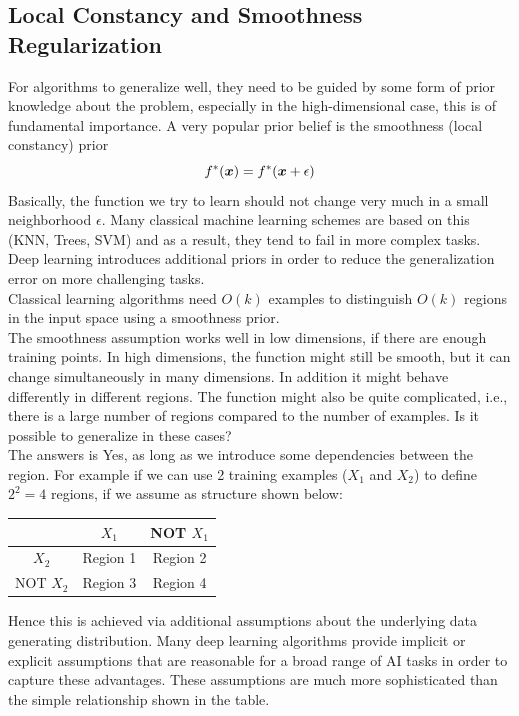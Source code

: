 \begin{multicols}{2}
	\subsection{Local Constancy and Smoothness Regularization}
	For algorithms to generalize well, they need to be guided by some form of prior knowledge about the problem, especially in the high-dimensional case, this is of fundamental importance.
	A very popular prior belief is the smoothness (local constancy) prior
	\[ f^\ast ({\bm{x}}) = f^\ast ({\bm{x}} + \epsilon) \]
	Basically, the function we try to learn should not change very much in a small neighborhood $\epsilon$.
	Many classical machine learning schemes are based on this (KNN, Trees, SVM) and as a result, they tend to fail in more complex tasks.
	Deep learning introduces additional priors in order to reduce the generalization error on more challenging tasks.\\
	Classical learning algorithms need $O(k)$ examples to distinguish $O(k)$ regions in the input space using a smoothness prior.\\

	The smoothness assumption works well in low dimensions, if there are enough training points.
	In high dimensions, the function might still be smooth, but it can change simultaneously in many dimensions.
	In addition it might behave differently in different regions.
	The function might also be quite complicated, i.e., there is a large number of regions compared to the number of examples. Is it possible to generalize in these cases?\\
	
	The answers is Yes, as long as we introduce some dependencies between the region.
	For example if we can use 2 training examples ($X_1$ and $X_2$) to define $2^2=4$ regions, if we assume as structure shown below:
	\begin{table}[H]
		\centering
		\begin{tabular}{c|c|c|}
			& $X_1$ & NOT $X_1$ \\ 
			\hline 
			$X_2$ & Region 1 & Region 2 \\ 
			\hline 
			NOT $X_2$ & Region 3 & Region 4 \\
			\hline
		\end{tabular} 
	\end{table}

	Hence this is achieved via additional assumptions about the underlying data generating distribution.
	Many deep learning algorithms provide implicit or explicit assumptions that are reasonable for a broad range of AI tasks in order to capture these advantages.
	These assumptions are much more sophisticated than the simple relationship shown in the table.\\
	

\end{multicols}
